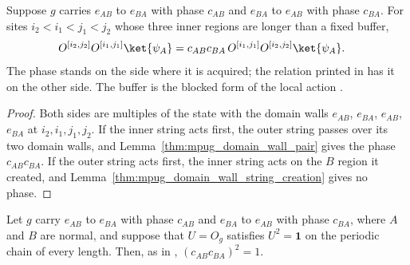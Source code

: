\begin{lemma}
    \label{thm:mpug_domain_wall_string_exchange}
    \leanok
    Suppose $g$ carries $e_{AB}$ to $e_{BA}$ with phase $c_{AB}$ and $e_{BA}$
    to $e_{AB}$ with phase $c_{BA}$. For sites $i_2<i_1<j_1<j_2$ whose three
    inner regions are longer than a fixed buffer,
    \begin{align}
        O^{[i_2,j_2]}O^{[i_1,j_1]}\ket{\psi_A}
         & =c_{AB}c_{BA}\,O^{[i_1,j_1]}O^{[i_2,j_2]}\ket{\psi_A}.
        \notag
    \end{align}
    The phase stands on the side where it is acquired; the relation printed
    in \cite[Section~III.F]{GarreRubioSchuch2024DomainWall} has it on the
    other side. The buffer is the blocked form of the local action
    \cite{gap:gs24_domain_wall_nondegenerate}.
\end{lemma}

\begin{proof}\leanok
    Both sides are multiples of the state with the domain walls $e_{AB}$,
    $e_{BA}$, $e_{AB}$, $e_{BA}$ at $i_2,i_1,j_1,j_2$. If the inner string
    acts first, the outer string passes over its two domain walls, and
    Lemma~\ref{thm:mpug_domain_wall_pair} gives the phase $c_{AB}c_{BA}$.
    If the outer string acts first, the inner string acts on the $B$ region
    it created, and Lemma~\ref{thm:mpug_domain_wall_string_creation} gives
    no phase.
\end{proof}

\begin{lemma}
    \label{lem:mpug_domain_wall_exchange_phase_square}
    \leanok
    Let $g$ carry $e_{AB}$ to $e_{BA}$ with phase $c_{AB}$ and $e_{BA}$ to
    $e_{AB}$ with phase $c_{BA}$, where $A$ and $B$ are normal, and suppose
    that $U=O_g$ satisfies $U^2=\mathbf 1$ on the periodic chain of every
    length. Then, as in \cite[Section~III.B]{GarreRubioSchuch2024DomainWall},
    $(c_{AB}c_{BA})^2=1$.
\end{lemma}

